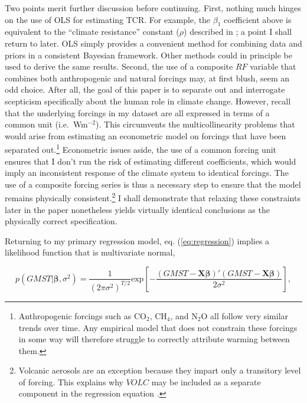\documentclass[smallextended]{svjour3}       %
\begin{document}
Two points merit further discussion before continuing. First, nothing
much hinges on the use of OLS for estimating TCR. For example, the
\(\beta_1\) coefficient above is equivalent to the ``climate
resistance'' constant (\(\rho\)) described in
\cite{gregory2008transient}; a point I shall return to later. OLS simply
provides a convenient method for combining data and priors in a
consistent Bayesian framework. Other methods could in principle be used
to derive the same results. Second, the use of a composite \(RF\)
variable that combines both anthropogenic and natural forcings may, at
first blush, seem an odd choice. After all, the goal of this paper is to
separate out and interrogate scepticism specifically about the human
role in climate change. However, recall that the underlying forcings in
my dataset are all expressed in terms of a common unit
(i.e.~Wm\(^{-2}\)). This circumvents the multicollinearity problems that
would arise from estimating an econometric model on forcings that have
been separated out.\footnote{Anthropogenic forcings such as CO\(_2\),
  CH\(_4\), and N\(_2\)O all follow very similar trends over time. Any
  empirical model that does not constrain these forcings in some way
  will therefore struggle to correctly attribute warming between them.}
Econometric issues aside, the use of a common forcing unit ensures that
I don't run the risk of estimating different coefficients, which would
imply an inconsistent response of the climate system to identical
forcings. The use of a composite forcing series is thus a necessary step
to ensure that the model remains physically consistent.\footnote{Volcanic
  aerosols are an exception because they impart only a transitory level
  of forcing. This explains why \(VOLC\) may be included as a separate
  component in the regression equation \cite{estrada2013statistically}.}
I shall demonstrate that relaxing these constraints later in the paper
nonetheless yields virtually identical conclusions as the physically
correct specification.

Returning to my primary regression model, eq. (\ref{eq:regression})
implies a likelihood function that is multivariate normal,

\begin{equation}
   p(GMST | \boldsymbol{\beta}, \sigma^2) =  \frac{1}{\left(2 \pi \sigma^2\right)^{T/2}} \text{exp}\left[ - \frac{(GMST - \mathbf{X}\boldsymbol{\beta})'(GMST - \mathbf{X}\boldsymbol{\beta})}{2 \sigma^2} \right], \label{eq:likelihood}
\end{equation}
\end{document}
